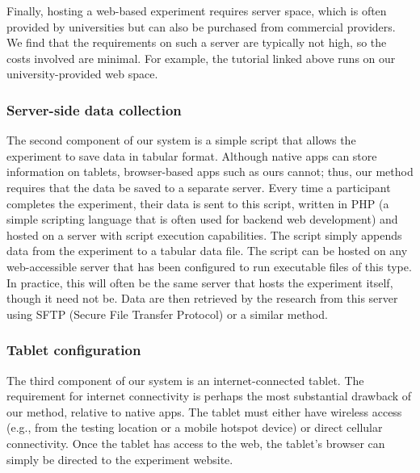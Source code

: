 \documentclass[man,noapacite]{apa2}
\begin{document}
Finally, hosting a web-based experiment requires server space, which is often provided by universities but can also be purchased from commercial providers. We find that the requirements on such a server are typically not high, so the costs involved are minimal. For example, the tutorial linked above runs on our university-provided web space.


\subsubsection{Server-side data collection}

The second component of our system is a simple script that allows the experiment to save data in tabular format. Although native apps can store information on tablets, browser-based apps such as ours cannot; thus, our method requires that the data be saved to a separate server. Every time a participant completes the experiment, their data is sent to this script, written in PHP (a simple scripting language that is often used for backend web development) and hosted on a server with script execution capabilities. The script simply appends data from the experiment to a tabular data file. The script can be hosted on any web-accessible server that has been configured to run executable files of this type. In practice, this will often be the same server that hosts the experiment itself, though it need not be. Data are then retrieved by the research from this server using SFTP (Secure File Transfer Protocol) or a similar method. 

\subsubsection{Tablet configuration}

The third component of our system is an internet-connected tablet. The requirement for internet connectivity is perhaps the most substantial drawback of our method, relative to native apps. The tablet must either have wireless access (e.g., from the testing location or a mobile hotspot device) or direct cellular connectivity. Once the tablet has access to the web, the tablet's browser can simply be directed to the experiment website. 
\end{document}
